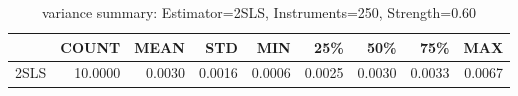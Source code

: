 \begin{table}[ht]
\centering
\caption{variance summary: Estimator=2SLS, Instruments=250, Strength=0.60}
\begin{tabular}{lrrrrrrrr}
\toprule
 & COUNT & MEAN & STD & MIN & 25\% & 50\% & 75\% & MAX \\
\midrule
2SLS & 10.0000 & 0.0030 & 0.0016 & 0.0006 & 0.0025 & 0.0030 & 0.0033 & 0.0067 \\
\bottomrule
\end{tabular}
\end{table}
